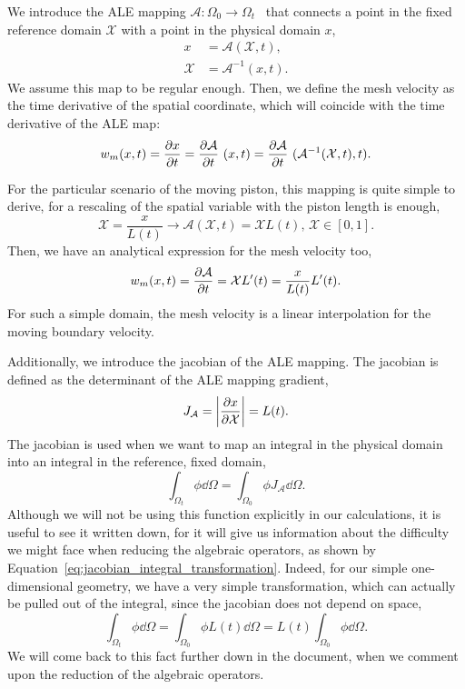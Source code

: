 \documentclass[../../thesis.tex]{subfiles}
\newcommand{\alemap}{\ensuremath{\mathcal{A}}}
\newcommand{\aleX}{\ensuremath{\mathcal{X}}}
\begin{document}
We introduce the ALE mapping 
\mbox{$\alemap : \Omega_0 \rightarrow \Omega_t$ }
that connects a point in the fixed reference domain $\mathcal{X}$ with a point in the physical domain $x$,
\begin{subequations}
    \begin{align}
        x &= \alemap(\aleX, t), \\
        \aleX &= \alemap^{-1}(x, t).
    \end{align}
\end{subequations}
We assume this map to be regular enough.
Then, we define the mesh velocity as the time derivative of the spatial coordinate, which will coincide with the time derivative of the ALE map:
\begin{equation}
    w_m(x,t) = \pdv{x}{t} = \pdv{\alemap}{t} \ (x, t) = \pdv{\alemap}{t} \ (\alemap^{-1} (\aleX,t), t).
\end{equation}

For the particular scenario of the moving piston, this mapping is quite simple to derive, 
for a rescaling of the spatial variable with the piston length is enough,
\begin{equation}
    \aleX = \frac{x}{L(t)} \rightarrow \alemap(\aleX, t) = \aleX L(t), \, \aleX \in [0,1].
\end{equation}
Then, we have an analytical expression for the mesh velocity too,
\begin{equation}
    w_m(x,t) = \pdv{\alemap}{t} = \aleX L'(t) = \frac{x}{L(t)} L'(t).
\end{equation}
For such a simple domain, the mesh velocity is a linear interpolation 
for the moving boundary velocity.

Additionally, we introduce the jacobian of the ALE mapping. 
The jacobian is defined as the determinant of the ALE mapping gradient,
\begin{equation}
    J_{\alemap} = \qty|\pdv{x}{\aleX}| = L(t).
    \label{eq:jacobian}
\end{equation}
The jacobian is used when we want to map an integral in the physical domain
into an integral in the reference, fixed domain,
\begin{equation}
    \int_{\Omega_t} \phi \dd \Omega = \int_{\Omega_0} \phi J_{\alemap} \dd \Omega.
    \label{eq:jacobian_integral_transformation}
\end{equation}
Although we will not be using this function explicitly in our calculations,
it is useful to see it written down, 
for it will give us information about the difficulty we might face when reducing the algebraic operators, as shown by Equation~\eqref{eq:jacobian_integral_transformation}.
Indeed, for our simple one-dimensional geometry, we have a very simple transformation,
which can actually be pulled out of the integral, since the jacobian does not depend on space,
\begin{equation}
    \int_{\Omega_t} \phi \dd \Omega 
    = 
    \int_{\Omega_0} \phi L(t) \dd \Omega
    =
    L(t) \int_{\Omega_0} \phi \dd \Omega.
    \label{eq:jacobian_pulled_out_integral}
\end{equation}
We will come back to this fact further down in the document,
when we comment upon the reduction of the algebraic operators.
\end{document}
